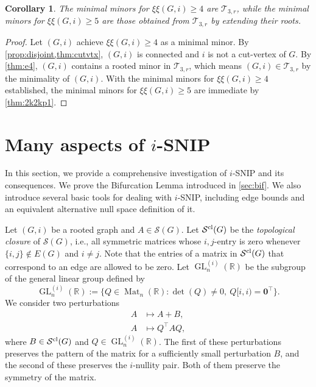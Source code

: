 \documentclass{article}
\newtheorem{corollary}[theorem]{Corollary}
\theoremstyle{definition}
\newcommand{\trans}{^\top}
\newcommand{\bzero}{\mathbf{0}}
\newcommand{\mptn}{\mathcal{S}} %
\newcommand{\mptncl}{\mathcal{S}^{\rm cl}}
\newcommand{\GL}[2][n]{\operatorname{GL}^{(#2)}_{#1}(\mathbb{R})}
\newcommand{\excise}{\xi\xi}
\newcommand{\ttfr}{\mathcal{T}_{3,r}}
\newcommand{\mat}[1][n]{\operatorname{Mat}_{#1}(\mathbb{R})}
\begin{document}
\begin{corollary}
\label{cor:e45}
The minimal minors for $\excise(G, i) \geq 4$ are $\ttfr$, while the minimal minors for $\excise(G, i) \geq 5$ are those obtained from $\ttfr$ by extending their roots. 
\end{corollary}
\begin{proof}
Let $(G,i)$ achieve $\excise(G, i) \geq 4$ as a minimal minor.
By \cref{prop:disjoint,thm:cutvtx}, $(G,i)$ is connected and $i$ is not a cut-vertex of $G$.  By \cref{thm:e4}, $(G,i)$ contains a rooted minor in $\ttfr$, which means $(G,i)\in\ttfr$ by the minimality of $(G,i)$.  With the minimal minors for $\excise(G, i) \geq  4$ established, the minimal minors for $\excise(G, i) \geq 5$ are immediate by \cref{thm:2k2kp1}. 
\end{proof}

\section{Many aspects of \texorpdfstring{$i$}{i}-SNIP}
\label{sec:snipthy}
In this section, we provide a comprehensive investigation of $i$-SNIP and its consequences.  We prove the Bifurcation Lemma introduced in \cref{sec:bif}.  We also introduce several basic tools for dealing with $i$-SNIP, including edge bounds and an equivalent alternative null space definition of it.

Let $(G,i)$ be a rooted graph and $A\in\mptn(G)$.  Let $\mptncl(G)$ be the \emph{topological closure} of $\mptn(G)$, i.e., all symmetric matrices whose $i,j$-entry is zero whenever $\{i,j\}\notin E(G)$ and $i\neq j$.
Note that the entries of a matrix in $\mptncl(G)$ that correspond to an edge are allowed to be zero.  Let $\GL{i}$ be the subgroup of the general linear group defined by 
\[
    \GL{i} := \{Q\in\mat : \det(Q) \neq 0,\ Q[i,i) = \bzero\trans\}.
\]
We consider two perturbations  
\[
    \begin{aligned}
    A &\mapsto A + B, \\
    A &\mapsto Q\trans AQ,
    \end{aligned}
\]
where $B\in\mptncl(G)$ and $Q\in\GL{i}$.  The first of these perturbations preserves the pattern of the matrix for a sufficiently small perturbation $B$, and the second of these preserves the $i$-nullity pair.  Both of them preserve the symmetry of the matrix.
\end{document}
